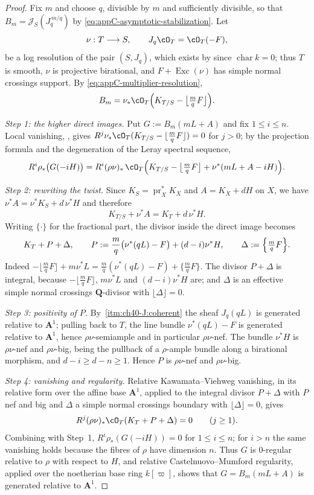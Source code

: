 \begin{proof}
Fix $m$ and choose $q$, divisible by $m$ and sufficiently divisible,
so that $B_m=\mathcal J_S(J_q^{\,m/q})$ by
\eqref{eq:appC-asymptotic-stabilization}.  Let
\[
 \nu:T\longrightarrow S,
 \qquad
 J_q\cO_T=\cO_T(-F),
\]
be a log resolution of the pair $(S,J_q)$, which exists by
 since $\operatorname{char}k=0$; thus $T$ is
smooth, $\nu$ is projective birational, and
$F+\operatorname{Exc}(\nu)$ has simple normal crossings support.  By
\eqref{eq:appC-multiplier-resolution},
\[
 B_m=\nu_*\cO_T\Bigl(K_{T/S}-\bigl\lfloor\tfrac mqF\bigr\rfloor\Bigr).
\]

\emph{Step 1: the higher direct images.}  Put
$G:=B_m(mL+A)$ and fix $1\le i\le n$.  Local vanishing,
\cite[Theorem~9.4.1]{PAG2}, gives
$R^j\nu_*\cO_T(K_{T/S}-\lfloor\tfrac mqF\rfloor)=0$ for $j>0$; by the
projection formula and the degeneration of the Leray spectral sequence,
\[
 R^i\rho_*\bigl(G(-iH)\bigr)
 =R^i(\rho\nu)_*\,\cO_T\Bigl(
   K_{T/S}-\bigl\lfloor\tfrac mqF\bigr\rfloor
   +\nu^*(mL+A-iH)\Bigr).
\]

\emph{Step 2: rewriting the twist.}  Since $K_S=\operatorname{pr}_X^*K_X$
and $A=K_X+dH$ on $X$, we have $\nu^*A=\nu^*K_S+d\,\nu^*H$ and
therefore
\[
 K_{T/S}+\nu^*A=K_T+d\,\nu^*H .
\]
Writing $\{\cdot\}$ for the fractional part, the divisor inside the direct
image becomes
\[
 K_T+P+\Delta,
 \qquad
 P:=\frac mq\bigl(\nu^*(qL)-F\bigr)+(d-i)\nu^*H,
 \qquad
 \Delta:=\Bigl\{\tfrac mqF\Bigr\}.
\]
Indeed $-\lfloor\tfrac mqF\rfloor+m\nu^*L
=\tfrac mq(\nu^*(qL)-F)+\{\tfrac mqF\}$.  The divisor $P+\Delta$ is
integral, because $-\lfloor\tfrac mqF\rfloor$, $m\nu^*L$ and
$(d-i)\nu^*H$ are; and $\Delta$ is an effective simple normal crossings
$\mathbf Q$-divisor with $\lfloor\Delta\rfloor=0$.

\emph{Step 3: positivity of $P$.}  By
\,\cref{itm:ch40-J:coherent} the sheaf $J_q(qL)$ is
generated relative to $\mathbf A^1$; pulling back to $T$, the line
bundle $\nu^*(qL)-F$ is generated relative to $\mathbf A^1$, hence
$\rho\nu$-semiample and in particular $\rho\nu$-nef.  The bundle
$\nu^*H$ is $\rho\nu$-nef and $\rho\nu$-big, being the pullback of a
$\rho$-ample bundle along a birational morphism, and $d-i\ge d-n\ge1$.
Hence $P$ is $\rho\nu$-nef and $\rho\nu$-big.

\emph{Step 4: vanishing and regularity.}  Relative Kawamata--Viehweg
vanishing, \cite[\S4.3]{PAG1} in its relative form over the affine base
$\mathbf A^1$, applied to the integral divisor $P+\Delta$ with
$P$ nef and big and $\Delta$ a simple normal crossings boundary with
$\lfloor\Delta\rfloor=0$, gives
\[
 R^j(\rho\nu)_*\cO_T(K_T+P+\Delta)=0
 \qquad(j\ge1).
\]
Combining with Step~1, $R^i\rho_*(G(-iH))=0$ for $1\le i\le n$; for
$i>n$ the same vanishing holds because the fibres of $\rho$ have
dimension $n$.  Thus $G$ is $0$-regular relative to $\rho$ with
respect to $H$, and relative Castelnuovo--Mumford regularity,
\cite[\S1.8]{PAG1} applied over the noetherian base ring $k[\varpi]$,
shows that $G=B_m(mL+A)$ is generated relative to $\mathbf A^1$.


\end{proof}
